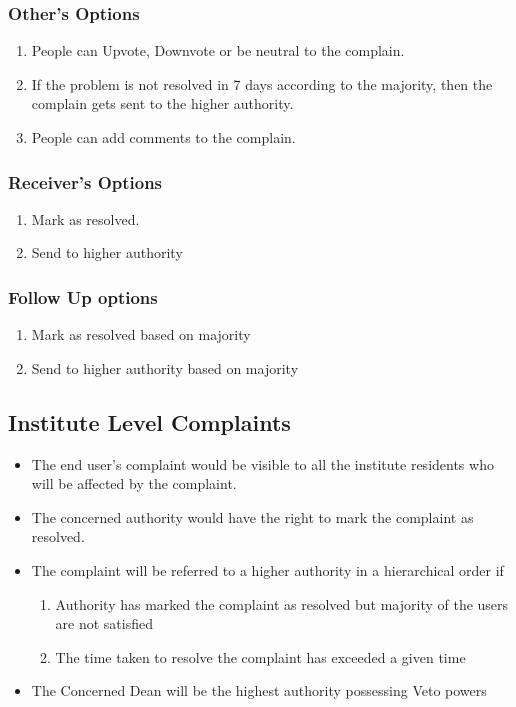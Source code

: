 \documentclass{article}
\begin{document}
			\subsubsection{Other's Options}
				\begin{enumerate}
					\item People can Upvote, Downvote or be neutral to the complain.
					\item If the problem is not resolved in 7 days according to the majority, then the complain gets sent to the higher authority.
					\item People can add comments to the complain.
				\end{enumerate}
			\subsubsection{Receiver's Options}
				\begin{enumerate}
					\item Mark as resolved.
					\item Send to higher authority
				\end{enumerate}
			\subsubsection{Follow Up options}
				\begin{enumerate}
					\item Mark as resolved based on majority
					\item Send to higher authority based on majority
				\end{enumerate}
		\subsection{Institute Level Complaints}
		\begin{itemize}
		\item The end user's complaint would be visible to all the institute residents who will be affected by the complaint.
		\item The concerned authority would have the right to mark the complaint as resolved.
		\item The complaint will be referred to a higher authority in a hierarchical order if 
			\begin{enumerate}
			\item Authority has marked the complaint as resolved but majority of the users are not satisfied
			\item The time taken to resolve the complaint has exceeded a given time 
			\end{enumerate}
		\item The Concerned Dean will be the highest authority possessing Veto powers 
		\end{itemize}
\end{document}
